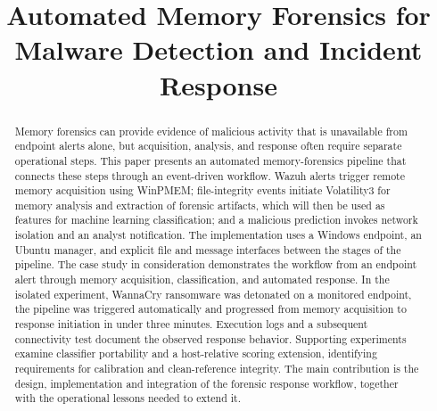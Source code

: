 \documentclass[conference]{IEEEtran}
\begin{document}
\title{Automated Memory Forensics for\\
Malware Detection and Incident Response}

\author{
\and
{}
\and
{}
}

\maketitle

\begin{abstract}
Memory forensics can provide evidence of malicious activity that is unavailable from endpoint alerts alone, but acquisition, analysis, and response often require separate operational steps. This paper presents an automated memory-forensics pipeline that connects these steps through an event-driven workflow. Wazuh alerts trigger remote memory acquisition using WinPMEM; file-integrity events initiate Volatility3 for memory analysis and extraction of forensic artifacts, which will then be used as features for machine learning classification; and a malicious prediction invokes network isolation and an analyst notification. The implementation uses a Windows endpoint, an Ubuntu manager, and explicit file and message interfaces between the stages of the pipeline. The case study in consideration demonstrates the workflow from an endpoint alert through memory acquisition, classification, and automated response. In the isolated experiment, WannaCry ransomware was detonated on a monitored endpoint, the pipeline was triggered automatically and progressed from memory acquisition to response initiation in under three minutes. Execution logs and a subsequent connectivity test document the observed response behavior. Supporting experiments examine classifier portability and a host-relative scoring extension, identifying requirements for calibration and clean-reference integrity. The main contribution is the design, implementation and integration of the forensic response workflow, together with the operational lessons needed to extend it.
\end{abstract}
\end{document}
